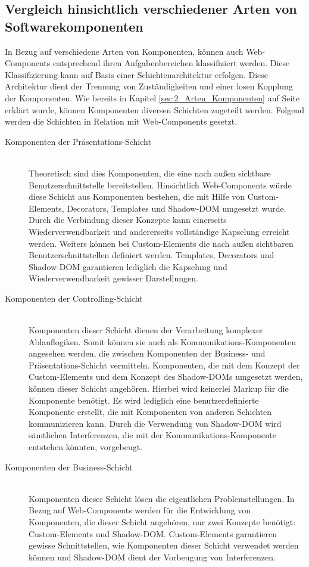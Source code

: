\subsection{Vergleich hinsichtlich verschiedener Arten von Softwarekomponenten}
In Bezug auf verschiedene Arten von Komponenten, können auch Web-Components entsprechend ihren Aufgabenbereichen klassifiziert werden. Diese Klassifizierung kann auf Basis einer Schichtenarchitektur erfolgen. Diese Architektur dient der Trennung von Zuständigkeiten und einer losen Kopplung der Komponenten. Wie bereits in Kapitel \ref{sec:2_Arten_Komponenten} auf Seite \pageref{sec:2_Arten_Komponenten} erklärt wurde, können Komponenten diversen Schichten zugeteilt werden. Folgend werden die Schichten in Relation mit Web-Components gesetzt.

\begin{description}
\item[Komponenten der Präsentations-Schicht] \hfill \\
Theoretisch sind dies Komponenten, die eine nach außen sichtbare Benutzerschnittstelle bereitstellen. Hinsichtlich Web-Components würde diese Schicht aus Komponenten bestehen, die mit Hilfe von Custom-Elements, Decorators, Templates und Shadow-DOM umgesetzt wurde. Durch die Verbindung dieser Konzepte kann einerseits Wiederverwendbarkeit und andererseits vollständige Kapselung erreicht werden. Weiters können bei Custom-Elements die nach außen sichtbaren Benutzerschnittstellen definiert werden. Templates, Decorators und Shadow-DOM garantieren lediglich die Kapselung und Wiederverwendbarkeit gewisser Darstellungen.

\item[Komponenten der Controlling-Schicht] \hfill \\
Komponenten dieser Schicht dienen der Verarbeitung komplexer Ablauflogiken. Somit können sie auch als Kommunikations-Komponenten angesehen werden, die zwischen Komponenten der Business- und Präsentations-Schicht vermitteln. Komponenten, die mit dem Konzept der Custom-Elements und dem Konzept des Shadow-DOMs umgesetzt werden, können dieser Schicht angehören. Hierbei wird keinerlei Markup für die Komponente benötigt. Es wird lediglich eine benutzerdefinierte Komponente erstellt, die mit Komponenten von anderen Schichten kommunizieren kann. Durch die Verwendung von Shadow-DOM wird sämtlichen Interferenzen, die mit der Kommunikations-Komponente entstehen könnten, vorgebeugt.

\item[Komponenten der Business-Schicht] \hfill \\
Komponenten dieser Schicht lösen die eigentlichen Problemstellungen. In Bezug auf Web-Components werden für die Entwicklung von Komponenten, die dieser Schicht angehören, nur zwei Konzepte benötigt: Custom-Elements und Shadow-DOM. Custom-Elements garantieren gewisse Schnittstellen, wie Komponenten dieser Schicht verwendet werden können und Shadow-DOM dient der Vorbeugung von Interferenzen.


\end{description}
